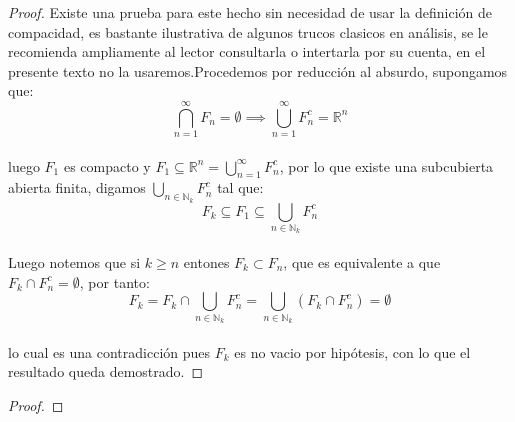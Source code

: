 \documentclass[11pt]{article}
\newcommand{\R}{\mathbb{R}}
\newcommand{\N}{\mathbb{N}}
\begin{document}
\begin{proof}
    Existe una prueba para este hecho sin necesidad de usar la definici\'on de compacidad, es bastante ilustrativa de algunos trucos clasicos en an\'alisis, se le recomienda ampliamente al lector consultarla o intertarla por su cuenta,
    en el presente texto no la usaremos.Procedemos por reducci\'on al absurdo, supongamos que:\,\\
    \begin{equation*}
        \bigcap_{n=1}^{\infty}F_n= \emptyset\implies \bigcup_{n=1}^{\infty}F_n^c=\R^n
    \end{equation*}\,\\
    luego $F_1$ es compacto y $F_1\subseteq \R^n=\bigcup_{n=1}^{\infty}F_n^c$, por lo que existe una subcubierta abierta finita, digamos $\displaystyle\bigcup_{n\in \N_k}F^c_{n}$ tal que:\,\\
    \begin{equation*}
        F_{k}\subseteq F_1\subseteq \bigcup_{n\in \N_k}F_n^c
    \end{equation*}\,\\
    Luego notemos que si $k\geq n$ entones $F_{k}\subset F_n$, que es equivalente a que $F_{k}\cap F^c_n=\emptyset$, por tanto:\,\\
    \begin{equation*}
       F_k=F_{k}\cap \bigcup_{n\in \N_k}F_n^c=\bigcup_{n\in \N_k}(F_{k}\cap F_n^c)=\emptyset
    \end{equation*}\,\\
    lo cual es una contradicci\'on pues $F_k$ es no vacio por hip\'otesis, con lo que el resultado queda demostrado.
\end{proof}
\begin{proof}
\end{proof}
\end{document}
